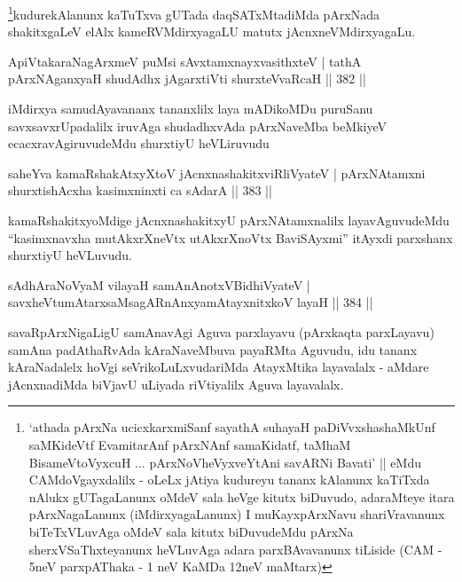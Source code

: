 \begin{artha}
\footnote{`athada pArxNa ucicxkarxmiSanf sayathA suhayaH paDiVvxshashaMkUnf saMKideVtf EvamitarAnf pArxNAnf samaKidatf, taMhaM BisameVtoVyxcuH ... pArxNoVheVyxveYtAni savARNi Bavati' || eMdu CAMdoVgayxdalilx - oLeLx jAtiya kudureyu tananx kAlanunx kaTiTxda nAlukx gUTagaLanunx oMdeV sala heVge kitutx biDuvudo, adaraMteye itara pArxNagaLanunx (iMdirxyagaLanunx) I muKayxpArxNavu shariVravanunx biTeTxVLuvAga oMdeV sala kitutx biDuvudeMdu pArxNa sherxVSaThxteyanunx heVLuvAga adara parxBAvavanunx tiLiside (CAM - 5neV parxpAThaka - 1 neV KaMDa 12neV maMtarx)}kudurekAlanunx kaTuTxva gUTada daqSATxMtadiMda pArxNada shakitxgaLeV elAlx kameRVMdirxyagaLU matutx jAcnxneVMdirxyagaLu.
\end{artha}


\begin{shl}
ApiVtakaraNagArxmeV puMsi sAvxtamxnayxvasithxteV |
tathA pArxNAganxyaH shudAdhx jAgarxtiVti shurxteVvaRcaH \hfill || 382 ||
\end{shl}

\begin{artha}
iMdirxya samudAyavananx tananxlilx laya mADikoMDu puruSanu savxsavxrUpadalilx iruvAga shudadhxvAda pArxNaveMba beMkiyeV ecacxravAgiruvudeMdu shurxtiyU heVLiruvudu
\end{artha}

\begin{shl}
saheYva kamaRshakAtxyX\s toV jAcnxnashakitxviRliVyateV |
pArxNAtamxni shurxtishAcx\s \s ha kasimxninxti ca sAdarA \hfill || 383 ||
\end{shl}

\begin{artha}
kamaRshakitxyoMdige jAcnxnashakitxyU pArxNAtamxnalilx layavAguvudeMdu ``kasimxnavxha mutAkxrXneVtx utAkxrXnoVtx BaviSAyxmi'' itAyxdi parxshanx shurxtiyU heVLuvudu.
\end{artha}

\begin{shl}
sAdhAraNoV\s yaM vilayaH samAnAnotxV\s BidhiVyateV |
savxheVtumAtarxsaMsagARnAnxyamAtayxnitxkoV layaH \hfill || 384 ||
\end{shl}

\begin{artha}
savaRpArxNigaLigU samAnavAgi Aguva parxlayavu (pArxkaqta parxLayavu) samAna padAthaRvAda kAraNaveMbuva payaRMta Aguvudu, idu tananx kAraNadalelx hoVgi seVrikoLuLxvudariMda AtayxMtika layavalalx - aMdare jAcnxnadiMda biVjavU uLiyada riVtiyalilx Aguva layavalalx.
\end{artha}

